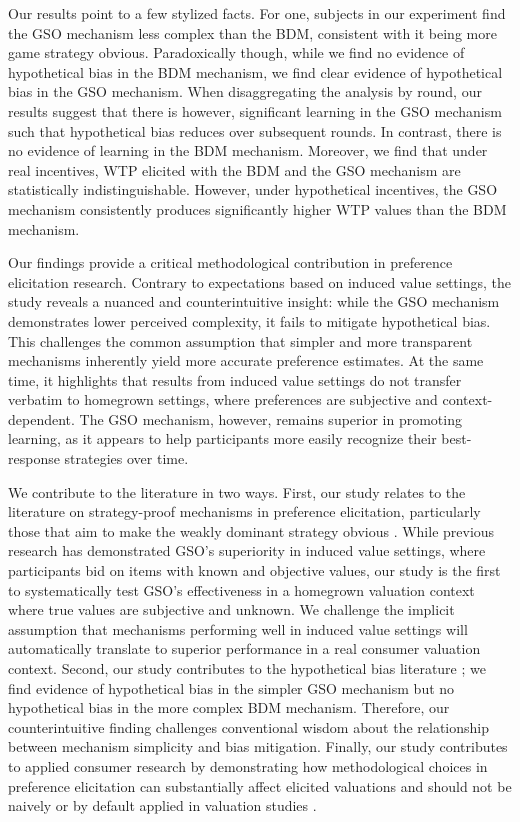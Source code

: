 \documentclass[12pt]{article}
\begin{document}
Our results point to a few stylized facts. For one, subjects in our experiment find the GSO mechanism less complex than the BDM, consistent with it being more game strategy obvious. Paradoxically though, while we find no evidence of hypothetical bias in the BDM mechanism, we find clear evidence of hypothetical bias in the GSO mechanism. When disaggregating the analysis by round, our results suggest that there is however, significant learning in the GSO mechanism such that hypothetical bias reduces over subsequent rounds. In contrast, there is no evidence of learning in the BDM mechanism.
Moreover, we find that under real incentives, WTP elicited with the BDM and the GSO mechanism are statistically indistinguishable. However, under hypothetical incentives, the GSO mechanism consistently produces significantly higher WTP values than the BDM mechanism.

Our findings provide a critical methodological contribution in preference elicitation research. Contrary to expectations based on induced value settings, the study reveals a nuanced and counterintuitive insight: while the GSO mechanism demonstrates lower perceived complexity, it fails to mitigate hypothetical bias. This challenges the common assumption that simpler and more transparent mechanisms inherently yield more accurate preference estimates. At the same time, it highlights that results from induced value settings do not transfer verbatim to homegrown settings, where preferences are subjective and context-dependent. The GSO mechanism, however, remains superior in promoting learning, as it appears to help participants more easily recognize their best-response strategies over time.

We contribute to the literature in two ways. First, our study relates to the literature on strategy-proof mechanisms in preference elicitation, particularly those that aim to make the weakly dominant strategy obvious \citep{li_obviously_2017, pycia_theory_2023, chakraborty_future_2025}. While previous research has demonstrated GSO's superiority in induced value settings, where participants bid on items with known and objective values,  our study is the first to systematically test GSO's effectiveness in a homegrown valuation context where true values are subjective and unknown. We challenge the implicit assumption that mechanisms performing well in induced value settings will automatically translate to superior performance in a real consumer valuation context. Second, our study contributes to the hypothetical bias literature \citep{penn2018understanding, cummings1999unbiased, loomis_whats_2011, fang_use_2021, list2001explicit, grebitus2013explaining}; we find evidence of hypothetical bias in the simpler GSO mechanism but no hypothetical bias in the more complex BDM mechanism. Therefore, our counterintuitive finding challenges conventional wisdom about the relationship between mechanism simplicity and bias mitigation. Finally, our study contributes to applied consumer research by demonstrating how methodological choices in preference elicitation can substantially affect elicited valuations and should not be naively or by default applied in valuation studies \citep{miller2011should, schmidt2020accurately}.
\end{document}
